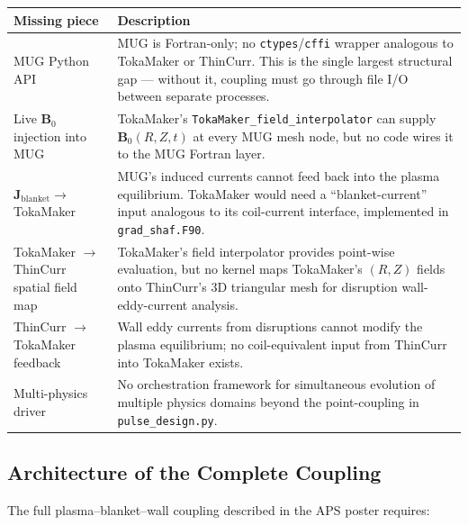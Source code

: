 \documentclass[11pt,letterpaper]{article}
\begin{document}
\begin{center}
\begin{longtable}{p{}p{}}
\toprule
\textbf{Missing piece} & \textbf{Description} \\
\midrule
MUG Python API & MUG is Fortran-only; no \texttt{ctypes}/\texttt{cffi}
  wrapper analogous to TokaMaker or ThinCurr.  This is the single largest
  structural gap --- without it, coupling must go through file I/O between
  separate processes. \\
\addlinespace
Live $\mathbf{B}_0$ injection into MUG & TokaMaker's
  \texttt{TokaMaker\_field\_interpolator} can supply $\mathbf{B}_0(R,Z,t)$
  at every MUG mesh node, but no code wires it to the MUG Fortran layer. \\
\addlinespace
$\mathbf{J}_{\mathrm{blanket}} \to$ TokaMaker & MUG's induced currents cannot
  feed back into the plasma equilibrium.  TokaMaker would need a
  ``blanket-current'' input analogous to its coil-current interface, implemented
  in \texttt{grad\_shaf.F90}. \\
\addlinespace
TokaMaker $\to$ ThinCurr spatial field map & TokaMaker's field interpolator
  provides point-wise evaluation, but no kernel maps TokaMaker's $(R,Z)$ fields
  onto ThinCurr's 3D triangular mesh for disruption wall-eddy-current analysis. \\
\addlinespace
ThinCurr $\to$ TokaMaker feedback & Wall eddy currents from disruptions cannot
  modify the plasma equilibrium; no coil-equivalent input from ThinCurr into
  TokaMaker exists. \\
\addlinespace
Multi-physics driver & No orchestration framework for simultaneous evolution of
  multiple physics domains beyond the point-coupling in \texttt{pulse\_design.py}. \\
\bottomrule
\end{longtable}
\end{center}

\subsection{Architecture of the Complete Coupling}

The full plasma--blanket--wall coupling described in the APS poster requires:
\end{document}
